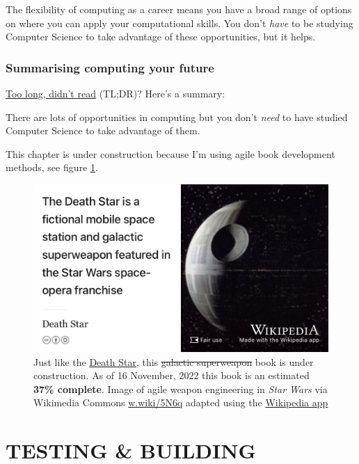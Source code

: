 \documentclass[
]{book}
\begin{document}
The flexibility of computing as a career means you have a broad range of options on where you can apply your computational skills. You don't \emph{have} to be studying Computer Science to take advantage of these opportunities, but it helps.

\hypertarget{tldr6}{%
\section{Summarising computing your future}\label{tldr6}}

\href{https://en.wiktionary.org/wiki/too_long;_didn\%27t_read}{Too long, didn't read} (TL;DR)? Here's a summary:

There are lots of opportunities in computing but you don't \emph{need} to have studied Computer Science to take advantage of them.

This chapter is under construction because I'm using agile book development methods, see figure \ref{fig:deathstar3-fig}.

\begin{figure}

{\centering \includegraphics[width=0.99\linewidth]{images/DeathStar2} 

}

\caption{Just like the \href{https://en.wikipedia.org/wiki/Death_Star}{Death Star}, this \sout{galactic superweapon} book is under construction. As of 16 November, 2022 this book is an estimated \textbf{37\% complete}. Image of agile weapon engineering in \emph{Star Wars} via Wikimedia Commons \href{https://w.wiki/5N6q}{w.wiki/5N6q} adapted using the \href{https://apps.apple.com/gb/app/wikipedia/id324715238}{Wikipedia app}}\label{fig:deathstar3-fig}
\end{figure}

\hypertarget{part-testing-building}{%
\part{TESTING \& BUILDING}\label{part-testing-building}}
\end{document}

